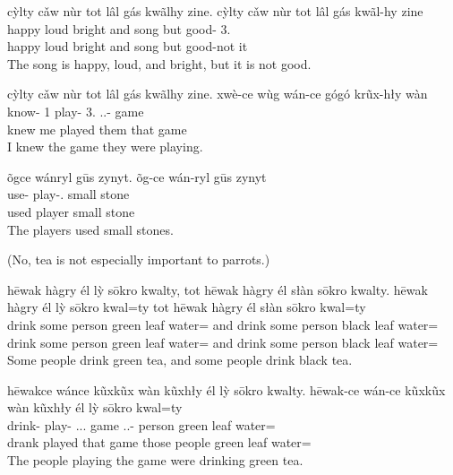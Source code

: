 \begin{exe}
    \ex
    cỳlty cǎw nùr tot lâl gás kwãlhy zine.
    \glll
    cỳlty cǎw nùr tot lâl gás kwãl-hy zine \\
    happy loud bright and song but good-\Neg{} 3\Sg{}.\Inanim{} \\
    happy loud bright and song but good-not it \\
    \glt
    The song is happy, loud, and bright, but it is not good.
\end{exe}

\begin{exe}
    \ex
    cỳlty cǎw nùr tot lâl gás kwãlhy zine.
    \glll
    xwè-ce wùg wán-ce gógó krũx-hły wàn \\
    know-\Pst{} 1\Sg{} play-\Pst{} 3\Pl{}.\Anim{} \Dem{}.\Inanim{}.\Dist{}-\Adj{} game \\
    knew me played them that game \\
    \glt
    I knew the game they were playing.
\end{exe}

\begin{exe}
    \ex
    õgce wánryl gūs zynyt.
    \glll
    õg-ce wán-ryl gūs zynyt \\
    use-\Pst{} play-\Agt{}.\Anim{} small stone \\
    used player small stone \\
    \glt
    The players used small stones.
\end{exe}

(No, tea is not especially important to parrots.)
\begin{exe}
    \ex
    hēwak hàgry él lỳ sōkro kwalty, tot hēwak hàgry él słàn sōkro kwalty.
    \glll
    hēwak hàgry él lỳ sōkro kwal=ty tot hēwak hàgry él słàn sōkro kwal=ty \\
    drink some person green leaf water=\Poss{} and drink some person black leaf water=\Poss{} \\
    drink some person green leaf water=\Poss{} and drink some person black leaf water=\Poss{} \\
    \glt
    Some people drink green tea, and some people drink black tea.
\end{exe}

\begin{exe}
    \ex
    hēwakce wánce kũxkũx wàn kũxhły él lỳ sōkro kwalty.
    \glll
    hēwak-ce wán-ce kũxkũx wàn kũxhły él lỳ sōkro kwal=ty \\
    drink-\Pst{} play-\Pst{} \Dem{}.\Anim{}.\Dist{}.\Pl{} game \Dem{}.\Anim{}.\Dist{}-\Adj{} person green leaf water=\Poss{} \\
    drank played that game those people green leaf water=\Poss{} \\
    \glt
    The people playing the game were drinking green tea.
\end{exe}

